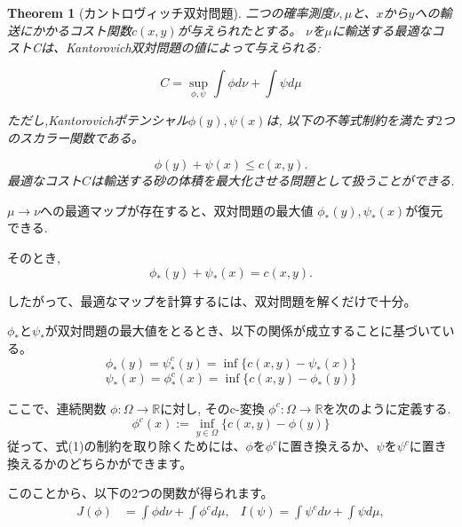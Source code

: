 \documentclass{jsarticle}
\newtheorem{thm}{Theorem}[section]
\theoremstyle{definition}
\begin{document}
\begin{thm}[カントロヴィッチ双対問題]
  二つの確率測度$\nu,\mu$と、$x$から$y$への輸送にかかるコスト関数$c(x, y)$が与えられたとする。
  $\nu$を$\mu$に輸送する最適なコストCは、Kantorovich双対問題の値によって与えられる:

  \begin{equation*}
      C = \sup_{\phi, \psi} \int \phi  d\nu + \int \psi  d\mu 
  \end{equation*}

  ただし,Kantorovichポテンシャル$\phi(y), \psi(x)$は, 以下の不等式制約を満たす$2$つのスカラー関数である。

  \begin{equation}
      \phi(y) + \psi(x) \le c(x, y).
  \end{equation}
  \vspace{\baselineskip} 
  最適なコスト$C$は輸送する砂の体積を最大化させる問題として扱うことができる.
\end{thm}
$\mu \to \nu$への最適マップが存在すると、双対問題の最大値 $\phi_*(y), \psi_*(x)$が復元できる.

そのとき, 
\begin{equation*}
  \phi_*(y) + \psi_*(x) = c(x, y).
\end{equation*}

したがって、最適なマップを計算するには、双対問題を解くだけで十分。

$\phi_*$と$\psi_*$が双対問題の最大値をとるとき、以下の関係が成立することに基づいている。
\begin{equation*}
  \phi_*(y) = \psi_*^c(y) = \inf\{c(x, y) - \psi_*(x) \}
\end{equation*}
\begin{equation*}
  \psi_*(x) = \phi_*^c(x) = \inf\{c(x, y) - \phi_*(y) \}
\end{equation*}

ここで、連続関数 $\phi: \Omega \to \mathbb{R}$に対し, そのc-変換 $\phi^c: \Omega \to \mathbb{R}$を次のように定義する.
  \begin{equation*}
    \phi^c(x) := \inf_{y \in \Omega} \{ c(x, y) - \phi(y) \}
  \end{equation*}
従って、式(1)の制約を取り除くためには、$\phi$を$\phi^c$に置き換えるか、$\psi$を$\psi^c$に置き換えるかのどちらかができます。


このことから、以下の2つの関数が得られます。
\begin{align*}
  J(\phi) &= \int \phi  d \nu + \int \phi^c  d \mu, &
  I(\psi) = \int \psi^c  d \nu + \int \psi  d \mu, 
\end{align*}
\end{document}
